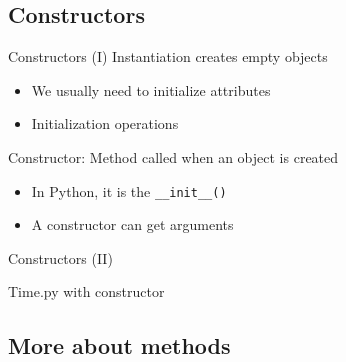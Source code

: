 \documentclass[10pt,compress]{beamer} %
\begin{document}
\subsection{Constructors}
\begin{frame}{Constructors (I)}
		Instantiation creates empty objects
		\begin{itemize}
			\item We usually need to initialize attributes
			\item Initialization operations
		\end{itemize}
		\alert{Constructor}: Method called when an object is created
		\begin{itemize}
			\item In Python, it is the \texttt{\_\_init\_\_()}
			\item A constructor can get arguments
		\end{itemize}
\end{frame}

\begin{frame}[plain]{Constructors (II)}
	\vspace{-0.3cm}
	\begin{block}{Time.py with constructor}
	\vspace{-0.3cm}
		
	\end{block}
\end{frame}

\subsection{More about methods}
\end{document}
